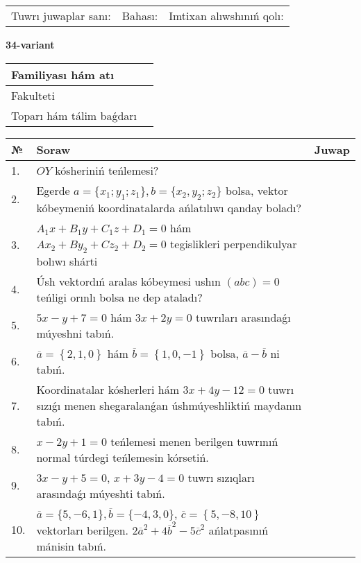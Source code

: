 \documentclass{article}
\begin{document}
\vspace{1cm}

\begin{tabular}{lll}
Tuwrı juwaplar sanı: \underline{\hspace{1.5cm}} & 
Bahası: \underline{\hspace{1.5cm}} & 
Imtixan alıwshınıń qolı: \underline{\hspace{2cm}} \\
\end{tabular}

\egroup

\newpage


\textbf{34-variant}\\

\bgroup
\def\arraystretch{1.6} %

\begin{tabular}{|m{5.7cm}|m{9.5cm}|}
\hline
Familiyası hám atı & \\
\hline
Fakulteti  & \\
\hline
Toparı hám tálim baǵdarı  & \\
\hline
\end{tabular}

\vspace{1cm}

\begin{tabular}{|m{0.7cm}|m{10cm}|m{4cm}|}
\hline
№ & Soraw & Juwap \\
\hline
1. & $OY$ kósheriniń teńlemesi? &  \\
\hline
2. & Egerde $a=\{ x_1; y_1; z_1\}, b=\{ x_2, y_2; z_2\}$ bolsa, vektor kóbeymeniń koordinatalarda ańlatılıwı qanday boladı? &  \\
\hline
3. & $A_1x+B_1y+C_1z+D_1=0$ hám $Ax_2+By_2+Cz_2+D_2=0$ tegislikleri perpendikulyar bolıwı shárti &  \\
\hline
4. & Úsh vektordıń aralas kóbeymesi ushın $(abc)=0$ teńligi orınlı bolsa ne dep ataladı? &  \\
\hline
5. & $5x-y+7=0$ hám $3x+2y=0$ tuwrıları arasındaǵı múyeshni tabıń. &  \\
\hline
6. & $\overline{a}=\left\{ 2, 1, 0 \right\}$ hám $\overline{b}=\left\{ 1, 0,-1 \right\}$ bolsa, $\overline{a}-\overline{b}$ ni tabıń. &  \\
\hline
7. & Koordinatalar kósherleri hám $ 3x+4y-12=0 $ tuwrı sızıǵı menen shegaralanǵan úshmúyeshliktiń maydanın tabıń. &  \\
\hline
8. & $x-2y+1=0$ teńlemesi menen berilgen tuwrınıń normal túrdegi teńlemesin kórsetiń. &  \\
\hline
9. & $3x-y+5=0$, $x+3y-4=0$ tuwrı sızıqları arasındaǵı múyeshti tabıń. &  \\
\hline
10. & $\overline{a}=\{5,-6, 1 \}, \overline{b}=\{-4, 3, 0 \} $, $\overline{c}=\left\{ 5,-8, 10 \right\}$ vektorları berilgen. $2{\overline{a}}^{2}+4{\overline{b}}^{2}-5{\overline{c}}^{2}$ ańlatpasınıń mánisin tabıń. &  \\
\hline
\end{tabular}
\end{document}
